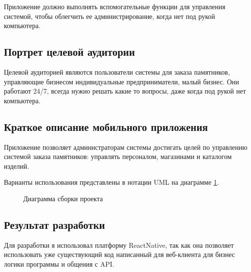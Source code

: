 \documentclass[a4paper,article,14pt]{extarticle}
\begin{document}
Приложение должно выполнять вспомогательные функции для управления системой,
чтобы облегчить ее администрирование, когда нет под рукой компьютера.

\subsection{Портрет целевой аудитории}
Целевой аудиторией являются пользователи системы для заказа памятников, 
управляющие бизнесом индивидуальные предприниматели, малый бизнес. Они работают 24/7,
всегда нужно решать какие то вопросы, даже когда под рукой нет компьютера.

\subsection{Краткое описание мобильного приложения}
Приложение позволяет администраторам системы достигать целей по управлению
системой заказа памятников: управлять персоналом, магазинами и каталогом изделий.

Варианты использования представлены в нотации UML на диаграмме \ref{mobileuml}.

\begin{figure}[ht]
\begin{center}
\caption{\label{mobileuml} Диаграмма сборки проекта}
\end {center}
\end {figure}

\subsection{Результат разработки}

Для разработки я использовал платформу ReactNative, так как она позволяет использовать
уже существующий код написанный для веб-клиента для бизнес логики программы и общения с API.
\end{document}
